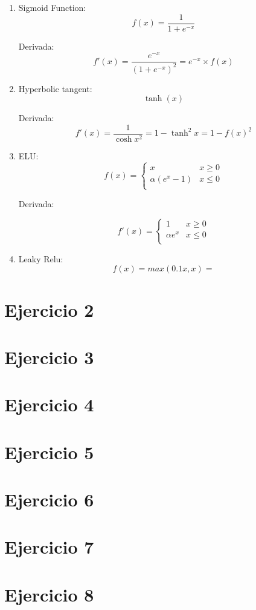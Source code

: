 \begin{enumerate}[label=(\alph*)]
    \item Sigmoid Function:
    \[
        f(x) = \frac{1}{1 + e^{-x}}
        \]
    
    Derivada:
    \[
        f'(x) = \frac{e^{-x}}{(1 + e^{-x})^2} =  e^{-x}\times f(x)
        \]
    \item Hyperbolic tangent:
    \[  \tanh(x)
        \]

    Derivada:
    \[
        f'(x) =  \frac{1}{\cosh{x}^2} = 1 - \tanh^2x = 1 - f(x)^2
        \]

    \item ELU:
    \[  f(x)=
        \begin{cases}
            x  & x \geq 0 \\
            \alpha(e^x - 1) & x \le 0\\
        \end{cases}
        \]

    Derivada:

    \[ f'(x)=
        \begin{cases}
            1  & x \geq 0 \\
            \alpha e^x & x \le 0\\
        \end{cases}
        \]
    \item Leaky Relu:
    \[ f(x) = max(0.1x, x) =  \]

\end{enumerate}

\section*{Ejercicio 2}

\section*{Ejercicio 3}

\section*{Ejercicio 4}

\section*{Ejercicio 5}

\section*{Ejercicio 6}

\section*{Ejercicio 7}

\section*{Ejercicio 8}

